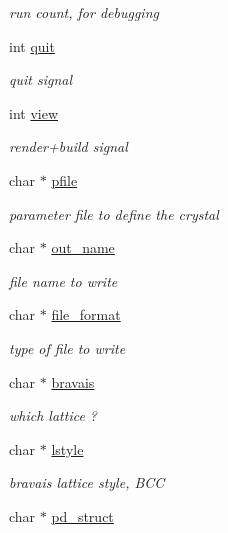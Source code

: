 \begin{DoxyCompactItemize}
\begin{DoxyCompactList}\small\item\em run count, for debugging \end{DoxyCompactList}\item 
int \hyperlink{class_reader_ada4132c63c686a21ea6eb8f05d724edc}{quit}
\begin{DoxyCompactList}\small\item\em quit signal \end{DoxyCompactList}\item 
int \hyperlink{class_reader_a4686a622a101960a17a1786a45b84bcd}{view}
\begin{DoxyCompactList}\small\item\em render+build signal \end{DoxyCompactList}\item 
char $\ast$ \hyperlink{class_reader_a2aa3818b76e5565fef7e72a5018ca084}{pfile}
\begin{DoxyCompactList}\small\item\em parameter file to define the crystal \end{DoxyCompactList}\item 
char $\ast$ \hyperlink{class_reader_a05d97010d814f91cffe66657e2c39ffd}{out\+\_\+name}
\begin{DoxyCompactList}\small\item\em file name to write \end{DoxyCompactList}\item 
char $\ast$ \hyperlink{class_reader_a8031979223c6835ee2a52be58c13f9b1}{file\+\_\+format}
\begin{DoxyCompactList}\small\item\em type of file to write \end{DoxyCompactList}\item 
char $\ast$ \hyperlink{class_reader_a9aa6c187535ed940397c836aacfcc0c1}{bravais}
\begin{DoxyCompactList}\small\item\em which lattice ? \end{DoxyCompactList}\item 
char $\ast$ \hyperlink{class_reader_aaaa3ec196647f9d79f39fac3db21d288}{lstyle}
\begin{DoxyCompactList}\small\item\em bravais lattice style, B\+C\+C \end{DoxyCompactList}\item 
char $\ast$ \hyperlink{class_reader_aa1f260272da17a496f1ecd3ce39281b9}{pd\+\_\+struct}

\end{DoxyCompactItemize}
